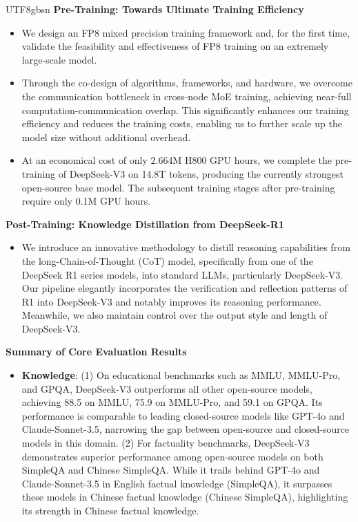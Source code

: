 \documentclass[11pt, a4paper, logo, copyright, nonumbering]{deepseek}
\newcommand{\dsviii}{DeepSeek-V3}
\begin{document}
\begin{CJK*}{UTF8}{gbsn}
\noindent
\textbf{Pre-Training: Towards Ultimate Training Efficiency}
\begin{itemize}[topsep=0pt]
    \item
    We design an FP8 mixed precision training framework and, for the first time, validate the feasibility and effectiveness of FP8 training on an extremely large-scale model. 
    \item 
    Through the co-design of algorithms, frameworks, and hardware, we overcome the communication bottleneck in cross-node MoE training, achieving near-full computation-communication overlap. 
    This significantly enhances our training efficiency and reduces the training costs, enabling us to further scale up the model size without additional overhead.
    \item 
    At an economical cost of only 2.664M H800 GPU hours, we complete the pre-training of \dsviii{} on 14.8T tokens, producing the currently strongest open-source base model. 
    The subsequent training stages after pre-training require only 0.1M GPU hours.
\end{itemize}

\noindent
\textbf{Post-Training: Knowledge Distillation from DeepSeek-R1}
\begin{itemize}[topsep=0pt]
    \item 
    We introduce an innovative methodology to distill reasoning capabilities from the long-Chain-of-Thought (CoT) model, specifically from one of the DeepSeek R1 series models, into standard LLMs, particularly \dsviii{}.
    Our pipeline elegantly incorporates the verification and reflection patterns of R1 into \dsviii{} and notably improves its reasoning performance.
    Meanwhile, we also maintain control over the output style and length of \dsviii{}. 
\end{itemize}
\noindent
\textbf{Summary of Core Evaluation Results}
\begin{itemize}[topsep=0pt]
    \item \textbf{Knowledge}:
    (1) 
    On educational benchmarks such as MMLU, MMLU-Pro, and GPQA, \dsviii{} outperforms all other open-source models, achieving 88.5 on MMLU, 75.9 on MMLU-Pro, and 59.1 on GPQA.
    Its performance is comparable to leading closed-source models like GPT-4o and Claude-Sonnet-3.5, narrowing the gap between open-source and closed-source models in this domain.
    (2)
    For factuality benchmarks, \dsviii{} demonstrates superior performance among open-source models on both SimpleQA and Chinese SimpleQA. 
    While it trails behind GPT-4o and Claude-Sonnet-3.5 in English factual knowledge (SimpleQA), it surpasses these models in Chinese factual knowledge (Chinese SimpleQA), highlighting its strength in Chinese factual knowledge.
    

\end{itemize}
\end{CJK*}
\end{document}
